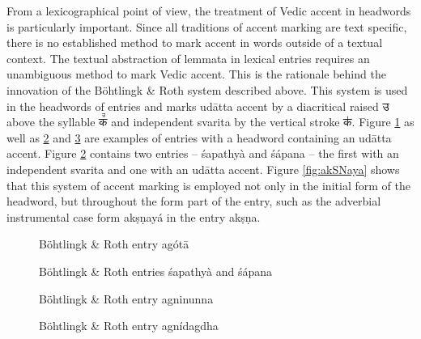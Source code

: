 From a lexicographical point of view, the treatment of Vedic accent in headwords is particularly important. Since all traditions of accent marking are text specific, there is no established method to mark accent in words outside of a textual context. The textual abstraction of lemmata in lexical entries requires an unambiguous method to mark Vedic accent. This is the rationale behind the innovation of the Böhtlingk \& Roth system described above. This system is used in the headwords of entries and marks udātta accent by a diacritical raised {\devfont उ} above the syllable {\devfont क꣫} and independent svarita by the vertical stroke {\devfont क॑}. Figure \ref{fig:agotAfull} as well as \ref{fig:PWG-SapaTya} and \ref{fig:agninunna} are examples of entries with a headword containing an udātta accent. Figure \ref{fig:PWG-SapaTya} contains two entries – śapathyà and śápana – the first with an independent svarita and one with an udātta accent. Figure \ref{fig:akSNaya} shows that this system of accent marking is employed not only in the initial form of the headword, but throughout the form part of the entry, such as the adverbial instrumental case form akṣṇayá in the entry akṣṇa.


\begin{figure}[!ht]
\begin{center}
\end{center}
\caption[Böhtlingk \& Roth entry agótā]{\label{fig:agotAfull}Böhtlingk \& Roth entry agótā}
\end{figure}

\begin{figure}[!ht]
\begin{center}
\end{center}
\caption[Böhtlingk \& Roth entries śapathyà and śápana]{\label{fig:PWG-SapaTya}Böhtlingk \& Roth entries śapathyà and śápana}
\end{figure}

\begin{figure}[!ht]
\begin{center}
\end{center}
\caption[Böhtlingk \& Roth entry agnínunna]{\label{fig:agninunna}Böhtlingk \& Roth entry agninunna}
\end{figure}

\begin{figure}[!ht]
\begin{center}
\end{center}
\caption[Böhtlingk \& Roth entry agnídagdha]{\label{fig:agnidagDa}Böhtlingk \& Roth entry agnídagdha}
\end{figure}

